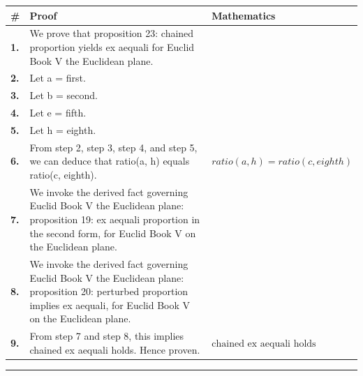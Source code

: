 \documentclass[11pt]{article}
\theoremstyle{definition}
\begin{document}
\begin{tabular}{@{} >{\raggedright\arraybackslash}p{} >{\raggedright\arraybackslash}p{} >{\raggedleft\arraybackslash}p{} @{}}
\textbf{\#} & \textbf{Proof} & \textbf{Mathematics} \\
\midrule
\textbf{1.} & We prove that proposition 23: chained proportion yields ex aequali for Euclid Book V the Euclidean plane. & \\[0.45em]
\textbf{2.} & Let a = first. & \\[0.45em]
\textbf{3.} & Let b = second. & \\[0.45em]
\textbf{4.} & Let e = fifth. & \\[0.45em]
\textbf{5.} & Let h = eighth. & \\[0.45em]
\textbf{6.} & From step 2, step 3, step 4, and step 5, we can deduce that ratio(a, h) equals ratio(c, eighth). & $\displaystyle ratio(a, h) = ratio(c, eighth)$ \\[0.45em]
\textbf{7.} & We invoke the derived fact governing Euclid Book V the Euclidean plane: proposition 19: ex aequali proportion in the second form, for Euclid Book V on the Euclidean plane. & \\[0.45em]
\textbf{8.} & We invoke the derived fact governing Euclid Book V the Euclidean plane: proposition 20: perturbed proportion implies ex aequali, for Euclid Book V on the Euclidean plane. & \\[0.45em]
\textbf{9.} & From step 7 and step 8, this implies chained ex aequali holds. Hence proven. & $\displaystyle \text{chained ex aequali holds}$ \\[0.45em]
\bottomrule
\end{tabular}
\label{thm:Geometry-Euclid Book V-proposition_23_chained_proportion_yields_ex_aequali}
\par\medskip\hrule
\end{document}
